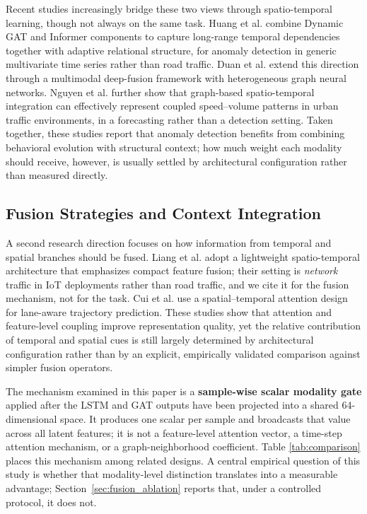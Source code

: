 \documentclass[journal]{IEEEtran}
\begin{document}
Recent studies increasingly bridge these two views through spatio-temporal learning, though not always on the same task. Huang et al. \cite{huang_multivariate_2024} combine Dynamic GAT and Informer components to capture long-range temporal dependencies together with adaptive relational structure, for anomaly detection in generic multivariate time series rather than road traffic. Duan et al. \cite{sun_framework_2025} extend this direction through a multimodal deep-fusion framework with heterogeneous graph neural networks. Nguyen et al. \cite{nguyen_spatiotemporal_2026} further show that graph-based spatio-temporal integration can effectively represent coupled speed--volume patterns in urban traffic environments, in a forecasting rather than a detection setting. Taken together, these studies report that anomaly detection benefits from combining behavioral evolution with structural context; how much weight each modality should receive, however, is usually settled by architectural configuration rather than measured directly.

\subsection{Fusion Strategies and Context Integration}
A second research direction focuses on how information from temporal and spatial branches should be fused. Liang et al. \cite{liang_anomaly_2025} adopt a lightweight spatio-temporal architecture that emphasizes compact feature fusion; their setting is \emph{network} traffic in IoT deployments rather than road traffic, and we cite it for the fusion mechanism, not for the task. Cui et al. \cite{cui_lane-flow-learning_2026} use a spatial--temporal attention design for lane-aware trajectory prediction. These studies show that attention and feature-level coupling improve representation quality, yet the relative contribution of temporal and spatial cues is still largely determined by architectural configuration rather than by an explicit, empirically validated comparison against simpler fusion operators.

The mechanism examined in this paper is a \textbf{sample-wise scalar modality gate} applied after the LSTM and GAT outputs have been projected into a shared 64-dimensional space. It produces one scalar per sample and broadcasts that value across all latent features; it is not a feature-level attention vector, a time-step attention mechanism, or a graph-neighborhood coefficient. Table \ref{tab:comparison} places this mechanism among related designs. A central empirical question of this study is whether that modality-level distinction translates into a measurable advantage; Section~\ref{sec:fusion_ablation} reports that, under a controlled protocol, it does not.
\end{document}
